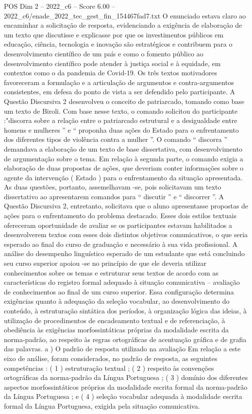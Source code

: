 \begin{textsample}{POS Dim 2 – 2022\_c6 – Score 6.00 – 2022\_c6/enade\_2022\_tec\_gest\_fin\_154467fad7.txt}
O enunciado estava claro ao encaminhar a solicitação de resposta, evidenciando a exigência de elaboração de um texto que discutisse e explicasse por que os investimentos públicos em educação, ciência, tecnologia e inovação são estratégicos e contribuem para o desenvolvimento científico de um país e como o fomento público ao desenvolvimento científico pode atender à justiça social e à equidade, em contextos como o da pandemia de Covid-19.
Os três textos motivadores favoreceram a formulação e a articulação de argumentos e contra-argumentos consistentes, em defesa do ponto de vista a ser defendido pelo participante.
A Questão Discursiva 2 desenvolveu o conceito de patriarcado, tomando como base um texto de Biroli.
Com base nesse texto, o comando solicitou do participante :"discorra sobre a relação entre o patriarcado estrutural e a desigualdade entre homens e mulheres ” e “ proponha duas ações do Estado para o enfrentamento dos diferentes tipos de violência contra a mulher ”.
O comando “ discorra ” demandava a elaboração de um texto de base dissertativa, com desenvolvimento de argumentação sobre o tema.
Em relação à segunda parte, o comando exigia a elaboração de duas propostas de ações, que deveriam conter informações sobre o agente da intervenção ( Estado ) para o enfrentamento da situação apresentada.
As duas questões, portanto, assemelhavam -se, pois solicitavam um texto dissertativo ao apresentarem comandos para “ discutir ” e “ discorrer ”.
A Questão Discursiva 2, entretanto, solicitava que o aluno apresentasse propostas de ações para o enfrentamento do problema destacado.
Esses dois estilos textuais ofereceram oportunidade de avaliar se os participantes estavam habilitados a desenvolverem textos com esses dois distintos objetivos comunicativos, o que seria esperado ao final do curso de graduação e necessário à sua vida profissional.
A análise do desempenho linguístico esperado de um estudante que está concluindo seu curso superior apoiou -se no princípio de que ele deveria utilizar conhecimentos sobre os temas e estruturar seus textos de acordo com as características do registro formal adequado à situação comunicativa – avaliação de conhecimentos ao final de um curso superior.
Essa configuração determina exigências quanto à adequação da seleção vocabular, ao desenvolvimento do conteúdo, à estruturação sintática dos períodos, à organização lógica das ideias, à utilização de procedimentos de encadeamento textual e de referenciação, à obediência às exigências morfossintáticas próprias da modalidade escrita da norma-padrão, ao respeito às regras ortográficas de acentuação gráfica e de grafia das palavras. a ) O padrão de resposta utilizado na avaliação Em relação a este eixo de análise, foram considerados, no padrão de resposta, as seguintes competências : ( 1 ) estruturação textual ; ( 2 ) respeito às convenções ortográficas da norma-padrão da Língua Portuguesa ; ( 3 ) domínio dos diferentes aspectos morfossintáticos próprios da modalidade escrita formal da norma-padrão da Língua Portuguesa ; e ( 4 ) seleção vocabular adequada à modalidade escrita formal da Língua Portuguesa, exigida pela situação comunicativa.

\end{textsample}
